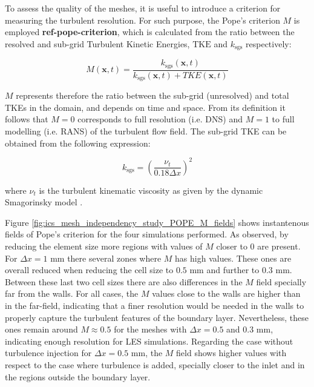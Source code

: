 To assess the quality of the meshes, it is useful to introduce a criterion for measuring the turbulent resolution. For such purpose, the Pope's criterion $M$ is employed \textbf{ref-pope-criterion}, which is calculated from the ratio between the resolved and sub-grid Turbulent Kinetic Energies,  $\mathrm{TKE}$ and $k_\mathrm{sgs}$ respectively:

\begin{equation}
M \left( \textbf{x}, t \right) = \frac{k_\mathrm{sgs} \left( \textbf{x}, t \right)}{k_\mathrm{sgs}  \left( \textbf{x}, t \right) + TKE \left( \textbf{x}, t \right)}
\end{equation}

$M$ represents therefore the ratio between the sub-grid (unresolved) and total TKEs in the domain, and depends on time and space. From its definition it follows that $M = 0$ corresponds to full resolution (i.e. DNS) and $M = 1$ to full modelling (i.e. RANS) of the turbulent flow field. The sub-grid TKE can be obtained from the following expression:


\begin{equation}
k_\mathrm{sgs} = \left( \frac{\nu_t}{0.18 \Delta x} \right)^2
\end{equation}

where $\nu_t$ is the turbulent kinematic viscosity as given by the dynamic Smagorinsky model . 

Figure \ref{fig:ics_mesh_independency_study_POPE_M_fields} shows instantenous fields of Pope's criterion for the four simulations performed. As observed, by reducing the element size more regions with values of $M$ closer to $0$ are present. For $\Delta x = 1$ mm there several zones where $M$ has high values. These ones are overall reduced when reducing the cell size to $0.5$ mm and further to $0.3$ mm. Between these last two cell sizes there are also differences in the $M$ field specially far from the walls. For all cases, the $M$ values close to the walls are higher than in the far-field, indicating that a finer resolution would be needed in the walls to properly capture the turbulent features of the boundary layer. Nevertheless, these ones remain around $M \approx 0.5$ for the meshes with $\Delta x = 0.5$ and $0.3$ mm, indicating enough resolution for LES simulations. Regarding the case without turbulence injection for $\Delta x = 0.5$ mm, the $M$ field shows higher values with respect to the case where turbulence is added, specially closer to the inlet and in the regions outside the boundary layer. 

